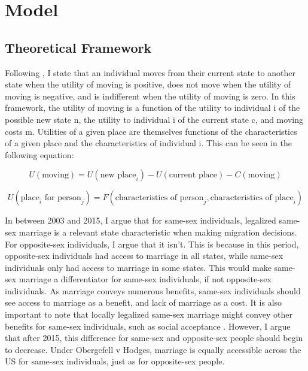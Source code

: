 \documentclass[12pt,letterpaper]{article}
\begin{document}
\section{Model}
\subsection{Theoretical Framework}
Following \citet{1, 12, 18}, I state that an individual moves from their current state to another state when the utility of moving is positive, does not move when the utility of moving is negative, and is indifferent when the utility of moving is zero. In this framework, the utility of moving is a function of the utility to individual i of the possible new state n, the utility to individual i of the current state c, and moving costs m. Utilities of a given place are themselves functions of the characteristics of a given place and the characteristics of individual i. This can be seen in the following equation: 

\begin{equation}
U(\text{moving}) = U(\text{new place}_i) - U(\text{current place}) - C(\text{moving})
\end{equation}

\begin{equation}
U(\text{place}_i \text{ for person}_j) = F(\text{characteristics of person}_j, \text{characteristics of place}_i)
\end{equation}


In between 2003 and 2015, I argue that for same-sex individuals, legalized same-sex marriage is a relevant state characteristic when making migration decisions. For opposite-sex individuals, I argue that it isn’t. This is because in this period, opposite-sex individuals had access to marriage in all states, while same-sex individuals only had access to marriage in some states. This would make same-sex marriage a differentiator for same-sex individuals, if not opposite-sex individuals. As marriage conveys numerous benefits, same-sex individuals should see access to marriage as a benefit, and lack of marriage as a cost. It is also important to note that locally legalized same-sex marriage might convey other benefits for same-sex individuals, such as social acceptance \citep{12}. However, I argue that after 2015, this difference for same-sex and opposite-sex people should begin to decrease. Under Obergefell v Hodges, marriage is equally accessible across the US for same-sex individuals, just as for opposite-sex people. 
\end{document}
